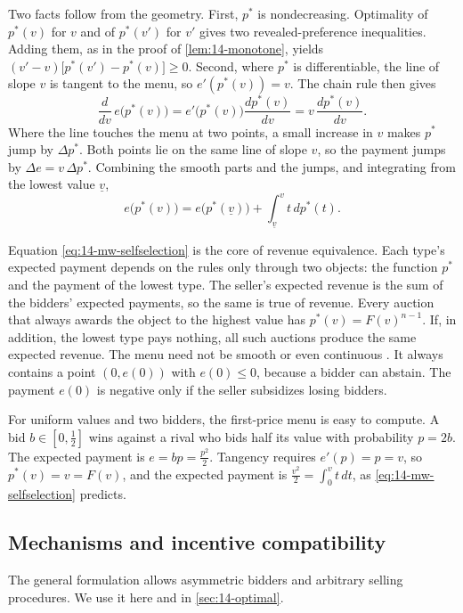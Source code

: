 Two facts follow from the geometry. First, $p^*$ is nondecreasing. Optimality of $p^*(v)$ for $v$ and of $p^*(v')$ for $v'$ gives two revealed-preference inequalities. Adding them, as in the proof of \cref{lem:14-monotone}, yields $(v'-v)\big[p^*(v')-p^*(v)\big]\ge 0$. Second, where $p^*$ is differentiable, the line of slope $v$ is tangent to the menu, so $e'(p^*(v))=v$. The chain rule then gives
\[
\frac{d}{dv}\,e\big(p^*(v)\big)=e'\big(p^*(v)\big)\frac{dp^*(v)}{dv}=v\,\frac{dp^*(v)}{dv}.
\]
Where the line touches the menu at two points, a small increase in $v$ makes $p^*$ jump by $\Delta p^*$. Both points lie on the same line of slope $v$, so the payment jumps by $\Delta e=v\,\Delta p^*$. Combining the smooth parts and the jumps, and integrating from the lowest value $\underline v$,
\begin{equation}\label{eq:14-mw-selfselection}
e\big(p^*(v)\big)=e\big(p^*(\underline v)\big)+\int_{\underline v}^{v}t\,dp^*(t).
\end{equation}

Equation \eqref{eq:14-mw-selfselection} is the core of revenue equivalence. Each type's expected payment depends on the rules only through two objects: the function $p^*$ and the payment of the lowest type. The seller's expected revenue is the sum of the bidders' expected payments, so the same is true of revenue. Every auction that always awards the object to the highest value has $p^*(v)=F(v)^{n-1}$. If, in addition, the lowest type pays nothing, all such auctions produce the same expected revenue. The menu need not be smooth or even continuous \citep[footnote 12]{MilgromWeber1982}. It always contains a point $(0,e(0))$ with $e(0)\le 0$, because a bidder can abstain. The payment $e(0)$ is negative only if the seller subsidizes losing bidders.

For uniform values and two bidders, the first-price menu is easy to compute. A bid $b\in[0,\frac12]$ wins against a rival who bids half its value with probability $p=2b$. The expected payment is $e=bp=\frac{p^2}{2}$. Tangency requires $e'(p)=p=v$, so $p^*(v)=v=F(v)$, and the expected payment is $\frac{v^2}{2}=\int_0^v t\,dt$, as \eqref{eq:14-mw-selfselection} predicts.

\subsection{Mechanisms and incentive compatibility}\label{sec:14-ret-mechanisms}

The general formulation allows asymmetric bidders and arbitrary selling procedures. We use it here and in \cref{sec:14-optimal}.

